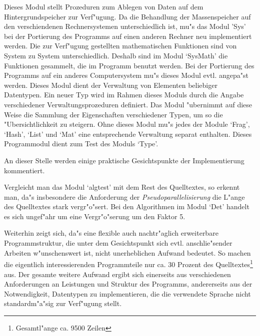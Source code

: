 \begin{MyDescription}
    Dieses Modul stellt Prozeduren zum Ablegen von Daten auf dem 
    Hintergrundspeicher zur Verf"ugung. Da die Behandlung der Massenspeicher
    auf den verschiendenen Rechnersystemen unterschiedlich ist, mu"s
    das Modul 'Sys' bei der Portierung des Programms auf einen
    anderen Rechner neu implementiert werden. 
    Die zur Verf"ugung gestellten mathematischen Funktionen sind von 
    System zu System unterschiedlich. Deshalb sind im Modul `SysMath' die
    Funktionen gesammelt, die im Programm benutzt werden. Bei der Portierung
    des Programms auf ein anderes Computersystem mu"s dieses Modul evtl.
    angepa"st werden.
    Dieses Modul dient der Verwaltung von Elementen beliebiger Datentypen.
    Ein neuer Typ wird im Rahmen dieses Moduls durch die Angabe 
    verschiedener Verwaltungsprozeduren definiert. Das Modul "ubernimmt 
    auf diese Weise die Sammlung der Eigenschaften verschiedener Typen, um 
    so die "Ubersichtlichkeit zu steigern. Ohne dieses Modul mu"s jedes 
    der Module `Frag', `Hash', `List' und `Mat' eine entsprechende 
    Verwaltung separat enthalten.
    Dieses Programmodul dient zum Test des Moduls `Type'.
\end{MyDescription}



An dieser Stelle werden einige praktische Gesichtspunkte der
Implementierung kommentiert.

Vergleicht man das Modul `algtest' mit dem Rest des Quelltextes, so erkennt 
man, da"s insbesondere die Anforderung der {\em Pseudoparallelisierung}
die L"ange des Quelltextes stark vergr"o"sert. Bei den Algorithmen im
Modul `Det' handelt es sich ungef"ahr um eine Vergr"o"serung 
um den Faktor 5.

Weiterhin zeigt sich, da"s eine flexible auch nachtr"aglich 
erweiterbare Programmstruktur, die unter dem Gesichtspunkt sich evtl. 
anschlie"sender Arbeiten w"unschenswert ist, nicht unerheblichen Aufwand
bedeutet. So machen die eigentlich interessierenden Programmteile nur
ca. 30 Prozent des Quelltextes\footnote{Gesamtl"ange ca. 9500 Zeilen} aus. 
Der gesamte weitere Aufwand ergibt sich
einerseits aus verschiedenen Anforderungen an Leistungen und Struktur des 
Programms, andererseits aus der Notwendigkeit, Datentypen zu implementieren,
die die verwendete Sprache nicht standardm"a"sig zur Verf"ugung stellt.

